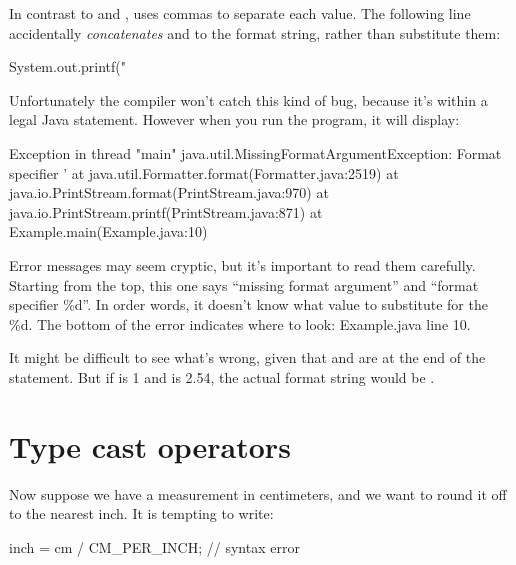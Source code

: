 In contrast to  and ,  uses commas to separate each value.
The following line accidentally {\em concatenates}  and  to the format string, rather than substitute them:

\begin{code}
System.out.printf("%
\end{code}

Unfortunately the compiler won't catch this kind of bug, because it's within a legal Java statement.
However when you run the program, it will display:


\begin{small}
\begin{stdout}
Exception in thread "main" java.util.MissingFormatArgumentException:
Format specifier '%
    at java.util.Formatter.format(Formatter.java:2519)
    at java.io.PrintStream.format(PrintStream.java:970)
    at java.io.PrintStream.printf(PrintStream.java:871)
    at Example.main(Example.java:10)
\end{stdout}
\end{small}

Error messages may seem cryptic, but it's important to read them carefully.
Starting from the top, this one says ``missing format argument'' and ``format specifier \%d''.
In order words, it doesn't know what value to substitute for the \%d.
The bottom of the error indicates where to look: Example.java line 10.

It might be difficult to see what's wrong, given that  and  are at the end of the  statement.
But if  is 1 and  is 2.54, the actual format string would be .


\section{Type cast operators}

Now suppose we have a measurement in centimeters, and we want to round it off to the nearest inch.
It is tempting to write:

\begin{code}
inch = cm / CM_PER_INCH;  // syntax error
\end{code}


